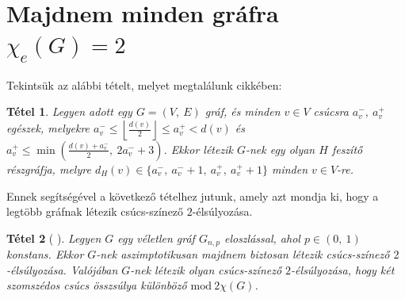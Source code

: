 \documentclass[12pt, a4paper]{report}
\newtheorem{tét}{Tétel}[section]
\theoremstyle{remark}
\theoremstyle{definition}
\begin{document}
\section{Majdnem minden gráfra $χ_e(G) = 2$}
Tekintsük az alábbi tételt, melyet megtalálunk \citeauthor{AddarioBerry2008} \cite{AddarioBerry2008} cikkében:

\begin{tét} \label{thm:degreeconstgeneric}
Legyen adott egy $G = (V,\ E)$ gráf, és minden $v \in V$ csúcsra $a_v^-,\ a_v^+$ egészek, melyekre $a_v^- \leq \left\lfloor \frac{d(v)}{2} \right\rfloor \leq a_v^+ < d(v)$ és $a_v^+ \leq \min \left(\frac{d(v) + a_v^-}{2},\ 2a_v^- + 3 \right)$. Ekkor létezik $G$-nek egy olyan $H$ feszítő részgráfja, melyre $d_H(v) \in \lbrace a_v^-,\ a_v^- + 1,\ a_v^+,\ a_v^+ + 1 \rbrace$ minden $v \in V$-re.
\end{tét}

Ennek segítségével a következő tételhez jutunk, amely azt mondja ki, hogy a legtöbb gráfnak létezik csúcs-színező $2$-élsúlyozása.

\begin{tét} [\citeauthor{AddarioBerry2008} \cite{AddarioBerry2008}]
Legyen $G$ egy véletlen gráf $G_{n,p}$ eloszlással, ahol $p \in (0,\ 1)$ konstans. Ekkor $G$-nek aszimptotikusan majdnem biztosan létezik csúcs-színező $2$-élsúlyozása. Valójában $G$-nek létezik olyan csúcs-színező $2$-élsúlyozása, hogy két szomszédos csúcs összsúlya különböző $\mathrm{mod}\ 2\chi(G)$.
\end{tét}
\end{document}
